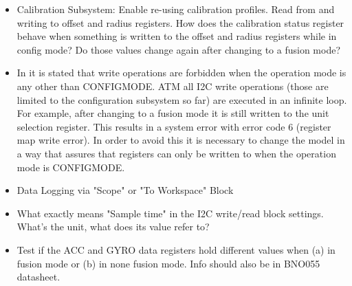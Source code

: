 \documentclass[a4paper]{article}
\begin{document}
 \begin{itemize}
\item Calibration Subsystem: Enable re-using calibration profiles. Read from and writing to offset and radius registers. How does the calibration status register behave when something is written to the offset and radius registers while in config mode? Do those values change again after changing to a fusion mode?  

\item In \cite{BNO1} it is stated that write operations are forbidden when the operation mode is any other than CONFIGMODE. ATM all I2C write operations (those are limited to the configuration subsystem so far) are executed in an infinite loop. For example, after changing to a fusion mode it is still written to the unit selection register. This results in a system error with error code 6 (register map write error). In order to avoid this it is necessary to change the model in a way that assures that registers can only be written to when the operation mode is CONFIGMODE.
  
\item Data Logging via "Scope" or "To Workspace" Block 

\item What exactly means "Sample time" in the I2C write/read block settings. What's the unit, what does its value refer to?

\item Test if the ACC and GYRO data registers hold different values when (a) in fusion mode or (b) in none fusion mode. Info should also be in BNO055 datasheet. 


\end{itemize}
 




\clearpage




\end{document}
